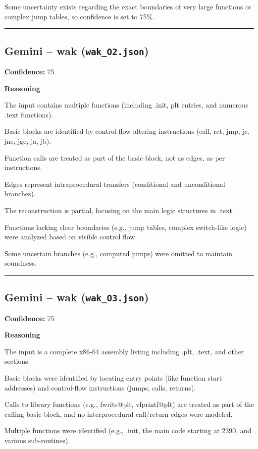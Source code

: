 Some uncertainty exists regarding the exact boundaries of very large functions or complex jump tables, so confidence is set to 75\%.

\bigskip
\hrule
\bigskip

\subsection{Gemini -- wak (\texttt{wak\_O2.json})}

\textbf{Confidence:} 75

\textbf{Reasoning}

The input contains multiple functions (including .init, plt entries, and numerous .text functions).

Basic blocks are identified by control-flow altering instructions (call, ret, jmp, je, jne, jge, ja, jb).

Function calls are treated as part of the basic block, not as edges, as per instructions.

Edges represent intraprocedural transfers (conditional and unconditional branches).

The reconstruction is partial, focusing on the main logic structures in .text.

Functions lacking clear boundaries (e.g., jump tables, complex switch-like logic) were analyzed based on visible control flow.

Some uncertain branches (e.g., computed jumps) were omitted to maintain soundness.

\bigskip
\hrule
\bigskip

\subsection{Gemini -- wak (\texttt{wak\_O3.json})}

\textbf{Confidence:} 75

\textbf{Reasoning}

The input is a complete x86-64 assembly listing including .plt, .text, and other sections.

Basic blocks were identified by locating entry points (like function start addresses) and control-flow instructions (jumps, calls, returns).

Calls to library functions (e.g., fwrite@plt, vfprintf@plt) are treated as part of the calling basic block, and no interprocedural call/return edges were modeled.

Multiple functions were identified (e.g., .init, the main code starting at 2390, and various sub-routines).

